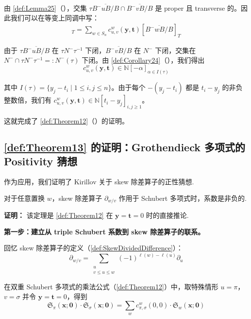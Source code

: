 由 \cref{def:Lemma25}（\cite[Lemma 2.5]{GX2025}），交集 $\tau \overline{B^-uB/B} \cap \overline{B^-vB/B}$ 是 proper%
%
%
 且 transverse 的。因此我们可以在等变上同调中写：
\begin{align*}
[\tau \overline{B^-uB/B} \cap \overline{B^-vB/B}]_T = \sum_{w \in S_n} c^w_{u,v}(\mathbf{y}, \mathbf{t})[\overline{B^-wB/B}]_T
\end{align*}

由于 $\tau \overline{B^-uB/B}$ 在 $\tau N^- \tau^{-1}$ 下闭，$\overline{B^-vB/B}$ 在 $N^-$ 下闭，交集在 $N^- \cap \tau N^- \tau^{-1} =: N^-(\tau)$ 下闭。由 \cref{def:Corollary24}（\cite[Corollary 2.4]{GX2025}），我们得出
$$c^w_{u,v}(\mathbf{y}, \mathbf{t}) \in \mathbb{N}[-\alpha]_{\alpha \in I(\tau)}$$

其中 $I(\tau) = \{y_j - t_i \mid 1 \leq i,j \leq n\}$。由于每个 $- (y_j - t_i)$ 都是 $t_i - y_j$ 的非负整数倍，我们有 $c^w_{u,v}(\mathbf{y}, \mathbf{t}) \in \mathbb{N}[t_i - y_j]_{i,j \geq 1}$。

这就完成了 \cref{def:Theorem12}（\cite[ Theorem 1.1]{GX2025}）的证明。

\subsection{\cref{def:Theorem13} 的证明：Grothendieck 多项式的 Positivity 猜想}
\label{sec:GrothendieckProof}

作为应用，我们证明了 Kirillov 关于 skew 除差算子的正性猜想.

\begin{Corollary}
\label{def:Theorem13}
对于任意置换 $w$，skew 除差算子 $\partial_{w/v}$ 作用于 Schubert 多项式时，系数是非负的.
\end{Corollary}



\textbf{证明：} 该定理是 \cref{def:Theorem12} 在 $\mathbf{y} = \mathbf{t} = 0$ 时的直接推论.

\medskip
\noindent\textbf{第一步：建立从 triple Schubert 系数到 skew 除差算子的联系。}

回忆 skew 除差算子的定义（\cref{def:SkewDividedDifference}）：
$$\partial_{w/v} = \sum_{\substack{u \\ v \leq u \leq w}} (-1)^{\ell(w)-\ell(u)} \partial_u$$

在双重 Schubert 多项式的乘法公式（\cref{def:Theorem12}）中，取特殊情形 $u = \pi$，$v = \sigma$ 并令 $\mathbf{y} = \mathbf{t} = 0$，得到
$$\mathfrak{S}_\pi(\mathbf{x}; \mathbf{0}) \cdot \mathfrak{S}_\sigma(\mathbf{x}; \mathbf{0}) = \sum_w c^w_{\pi,\sigma}(0, 0) \cdot \mathfrak{S}_w(\mathbf{x}; \mathbf{0}) \label{eq:pi-sigma-product-zero}$$


